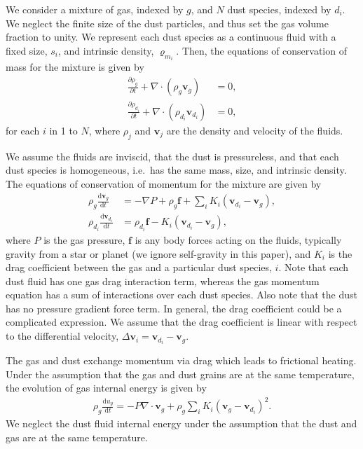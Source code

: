 \documentclass[fleqn,usenatbib]{mnras}
\newcommand{\dd}{\mathrm{d}}
\let\vec\mathbf
\begin{document}
We consider a mixture of gas, indexed by \(g\), and \(N\) dust species, indexed
by \(d_i\). We neglect the finite size of the dust particles, and thus set the
gas volume fraction to unity. We represent each dust species as a continuous
fluid with a fixed size, \(s_i\), and intrinsic density, \(\varrho_{m_i}\).
Then, the equations of conservation of mass for the mixture is given by
%
\begin{align}
   \label{eqn:conserve-gas-mass}
   \frac{\partial \rho_g}{\partial t} + \nabla \cdot (\rho_g \vec{v}_g) &= 0, \\
   \label{eqn:conserve-dust-mass}
   \frac{\partial \rho_{d_i}}{\partial t} + \nabla \cdot (\rho_{d_i} \vec{v}_{d_i}) &= 0,
\end{align}
%
for each \(i\) in 1 to \(N\), where \(\rho_j\) and \(\vec{v}_j\) are the density
and velocity of the fluids.

We assume the fluids are inviscid, that the dust is pressureless, and that each
dust species is homogeneous, i.e.\ has the same mass, size, and intrinsic
density. The equations of conservation of momentum for the mixture are given by
%
\begin{align}
   \rho_g \frac{\dd \vec{v}_g}{\dd t}
      &= - \nabla P + \rho_g \vec{f} + \sum_i K_i \left(\vec{v}_{d_i}
         - \vec{v}_{g}\right), \\
   \rho_{d_i} \frac{\dd \vec{v}_{d_i}}{\dd t}
      &= \rho_{d_i} \vec{f} - K_i \left(\vec{v}_{d_i} - \vec{v}_{g}\right),
\end{align}
%
where \(P\) is the gas pressure, \(\vec{f}\) is any body forces acting on the
fluids, typically gravity from a star or planet (we ignore self-gravity in this
paper), and \(K_i\) is the drag coefficient between the gas and a particular
dust species, \(i\). Note that each dust fluid has one gas drag interaction
term, whereas the gas momentum equation has a sum of interactions over each dust
species. Also note that the dust has no pressure gradient force term. In
general, the drag coefficient could be a complicated expression. We assume that
the drag coefficient is linear with respect to the differential velocity,
\(\Delta \vec{v}_i = \vec{v}_{d_i} - \vec{v}_g \).

The gas and dust exchange momentum via drag which leads to frictional heating.
Under the assumption that the gas and dust grains are at the same temperature,
the evolution of gas internal energy is given by
%
\begin{align}
   \label{eqn:conserve-energy}
   \rho_g \frac{\dd u_g}{\dd t} =
      - P \nabla \cdot \vec{v}_g + \rho_g \sum_i K_i {(\vec{v}_g - \vec{v}_{d_i})}^2.
\end{align}
%
We neglect the dust fluid internal energy under the assumption that the dust and
gas are at the same temperature.
\end{document}
